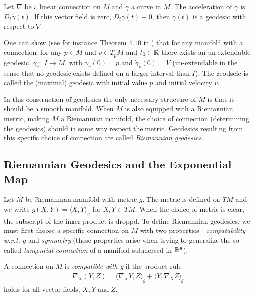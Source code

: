\begin{definition}
Let $\nabla$ be a linear connection on $M$ and $\gamma$ a curve in $M$. The acceleration of $\gamma$ is $D_t \dot{\gamma}(t)$. If this vector field is zero, $D_t \dot{\gamma}(t) \equiv 0$, then $\gamma(t)$ is a geodesic with respect to $\nabla$
\end{definition}

One can show (see for instance Theorem $4.10$ in \cite{lee2006riemannian}) that for any manifold with a connection, for any $p \in M$ and $v \in T_pM$ and $t_0 \in \mathbb{R}$ there exists an un-extendable geodesic, $\gamma_v: \; I \rightarrow M$, with $\gamma_v(0) = p$ and $\dot{\gamma}_v(0) = V$ (un-extendable in the sense that no geodesic exists defined on a larger interval than $I$). The geodseic is called the (maximal) geodesic with initial value $p$ and initial velocity $v$.

In this construction of geodesics the only necessary structure of $M$ is that it should be a smooth manifold. When $M$ is also equipped with a Riemannian metric, making $M$ a Riemannian manifold, the choice of connection (determining the geodesics) should in some way respect the metric. Geodesics resulting from this specific choice of connection are called \textit{Riemannian geodesics}.

\subsection{Riemannian Geodesics and the Exponential Map}

Let $M$ be Riemannian manifold with metric $g$. The metric is defined on $TM$ and we write $g(X,Y) = \langle X, Y \rangle_g$ for $X, Y \in TM$. When the choice of metric is clear, the subscript of the inner product is droppd. To define Riemannian geodesics, we must first choose a specific connection on $M$ with two properties - \textit{compatability w.r.t. $g$} and \textit{symmetry} (these properties arise when trying to generalize the so-called \textit{tangential connection} of a manifold submersed in $\mathbb{R}^n$).

\begin{definition}
A connection on $M$ is \textit{compatible with g} if the product rule
\begin{align*}
\nabla_X (Y, Z) = \langle \nabla_X Y, Z \rangle_g + \langle Y, \nabla_X Z \rangle_g
\end{align*}
holds for all vector fields, $X, Y$ and $Z$.
\end{definition}

